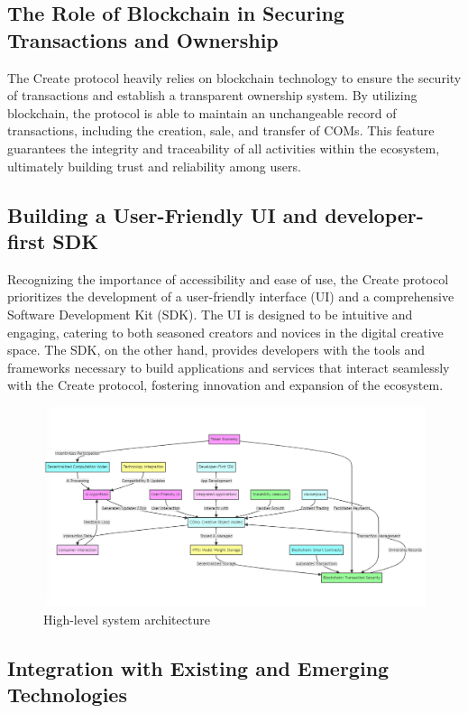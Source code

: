 \documentclass[12pt,a4paper]{article}
\begin{document}
\subsection{The Role of Blockchain in Securing Transactions and Ownership}

The Create protocol heavily relies on blockchain technology to ensure the security of transactions and establish a transparent ownership system. By utilizing blockchain, the protocol is able to maintain an unchangeable record of transactions, including the creation, sale, and transfer of COMs. This feature guarantees the integrity and traceability of all activities within the ecosystem, ultimately building trust and reliability among users.


\subsection{Building a User-Friendly UI and developer-first SDK}

Recognizing the importance of accessibility and ease of use, the Create protocol prioritizes the development of a user-friendly interface (UI) and a comprehensive Software Development Kit (SDK). The UI is designed to be intuitive and engaging, catering to both seasoned creators and novices in the digital creative space. The SDK, on the other hand, provides developers with the tools and frameworks necessary to build applications and services that interact seamlessly with the Create protocol, fostering innovation and expansion of the ecosystem.


\begin{figure}
    \centering
    \includegraphics[width=1\linewidth]{create_4.png}
    \caption{High-level system architecture}
    \label{fig:system-architecture}
\end{figure}

\subsection{Integration with Existing and Emerging Technologies}
\end{document}
